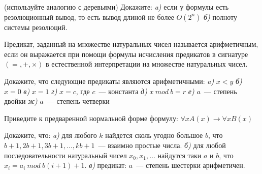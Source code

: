 \setcounter{curtask}{14}


\begin{task} (используйте аналогию с деревьями)
    Докажите: {\it a)} если у формулы есть резолюционный вывод, то
    есть вывод длиной не более $O(2^n)$ {\it б)} полноту системы
    резолюций.
\end{task}

Предикат, заданный на множестве натуральных чисел называется
арифметичным, если он выражается при помощи формулы исчисления
предикатов в сигнатуре $(=, +, \times)$ в естественной интерпретации
на множестве натуральных чисел.

\begin{task}
    Докажите, что следующие предикаты являются арифметичными:
    {\it a)} $x < y$
    {\it б)} $x = 0$
    {\it в)} $x = 1$
    {\it г)} $x = c$, где $c$~--- константа
    {\it д)} $x~mod~b = r$
    {\it е)} $a$~--- степень двойки
    {\it ж)} $a$~--- степень четверки
\end{task}

\begin{task}
    Приведите к предваренной нормальной форме формулу:
    $\forall x A(x) \rightarrow \forall x B(x)$
\end{task}

\begin{task}
    Докажите, что:
    {\it a)} для любого $k$ найдется сколь угодно большое $b$, что
    $b + 1, 2b + 1, 3b + 1, \dots, kb + 1$~--- взаимно простые числа.
    {\it б)} для любой последовательности натуральный чисел $x_0, x_1,
    \dots$ найдутся таки $a$ и $b$, что $x_i = a_i~ mod ~ b(i + 1) +
    1$.
    {\it в)} предикат: $a$~--- степень шестерки арифметичен.
\end{task}